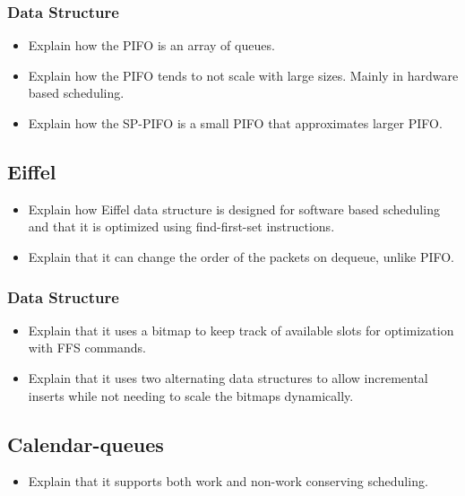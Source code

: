 \documentclass[sigconf, nonacm]{acmart}
\begin{document}
\subsubsection{Data Structure}

\begin{itemize}
  \item Explain how the PIFO is an array of queues.
  \item Explain how the PIFO tends to not scale with large sizes. Mainly in hardware based scheduling.
  \item Explain how the SP-PIFO is a small PIFO that approximates larger PIFO.
\end{itemize}


\subsection{Eiffel}

\begin{itemize}
  \item Explain how Eiffel\cite{Saeed2019} data structure is designed for software based scheduling and that it is optimized using find-first-set instructions.
  \item Explain that it can change the order of the packets on dequeue, unlike PIFO.
\end{itemize}


\subsubsection{Data Structure}

\begin{itemize}
  \item Explain that it uses a bitmap to keep track of available slots for optimization with FFS commands.
  \item Explain that it uses two alternating data structures to allow incremental inserts while not needing to scale the bitmaps dynamically.
\end{itemize}


\subsection{Calendar-queues}

\begin{itemize}
  \item Explain that it supports both work and non-work conserving scheduling.
\end{itemize}
\end{document}
